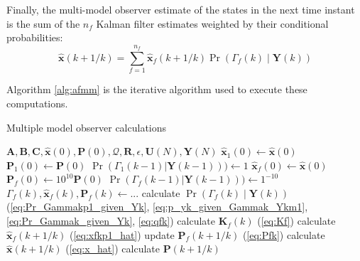 Finally, the multi-model observer estimate of the states in the next time instant is the sum of the $n_f$ Kalman filter estimates weighted by their conditional probabilities:
\begin{equation} \label{eq:x_hat}
	\mathbf{\hat{x}}(k+1/k) = \sum_{f=1}^{n_f} \mathbf{\hat{x}}_f(k+1/k) \Pr(\Gamma_f(k) \mid \mathbf{Y}(k))
\end{equation}


Algorithm \ref{alg:afmm} is the iterative algorithm used to execute these computations.

\begin{algorithm}
	\caption{Multiple model observer calculations}  \label{alg:afmm}
	\begin{algorithmic}
			\Require $\mathbf{A},\mathbf{B},\mathbf{C},\mathbf{\hat{x}}(0), \mathbf{P}(0), \mathcal{Q}, \mathbf{R}, \epsilon, \mathbf{U}(N), \mathbf{Y}(N)$
			\State $\mathbf{\hat{x}}_1(0) \gets \mathbf{\hat{x}}(0)$    %
			\State $\mathbf{P}_1(0) \gets \mathbf{P}(0)$
			\State $\Pr(\Gamma_1(k-1)|\mathbf{Y}(k-1))) \gets 1$
			\State $\mathbf{\hat{x}}_f(0) \gets \mathbf{\hat{x}}(0)$
			\State $\mathbf{P}_f(0) \gets 10^{10}\mathbf{P}(0)$
			\State $\Pr(\Gamma_f(k-1)|\mathbf{Y}(k-1))) \gets 1^{-10}$
			\EndFor
			\State $\Gamma_f(k), \mathbf{\hat{x}}_f(k), \mathbf{P}_f(k) \gets ...$   %
			\State calculate $\Pr(\Gamma_f(k) \mid \mathbf{Y}(k))$ (\ref{eq:Pr_Gammakp1_given_Yk}, \ref{eq:p_yk_given_Gammak_Ykm1}, \ref{eq:Pr_Gammak_given_Yk}, \ref{eq:qfk})
			\State calculate $\mathbf{K}_f(k)$ (\ref{eq:Kf}) 
			\State calculate $\mathbf{\hat{x}}_f(k+1/k)$ (\ref{eq:xfkp1_hat})
			\State update $\mathbf{P}_f(k+1/k)$ (\ref{eq:Pfk})
			\EndFor
			\State calculate $\mathbf{\hat{x}}(k+1/k)$ (\ref{eq:x_hat}) 
			\State calculate $\mathbf{P}(k+1/k)$   %
			\EndFor
		\end{algorithmic}
\end{algorithm}

